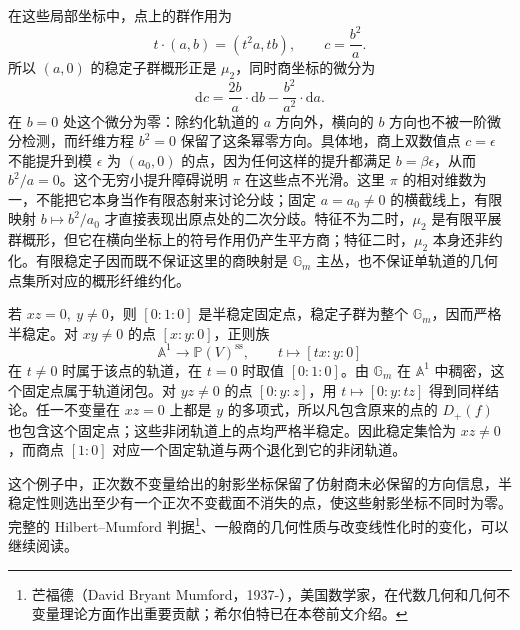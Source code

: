 \begin{example}
	\ProseParagraphBreak
	在这些局部坐标中，点上的群作用为
	\[
		t\cdot(a,b)=(t^2a,tb),\qquad c=\frac{b^2}{a}.
	\]
	所以 \((a,0)\) 的稳定子群概形正是 \(\mu_2\)，同时商坐标的微分为
	\[
		\mathrm{d}c=\frac{2b}{a}\cdot\mathrm{d}b -\frac{b^2}{a^2}\cdot\mathrm{d}a.
	\]
	在 \(b=0\) 处这个微分为零：除约化轨道的 \(a\) 方向外，横向的 \(b\) 方向也不被一阶微分检测，而纤维方程 \(b^2=0\) 保留了这条幂零方向。具体地，商上双数值点 \(c=\epsilon\) 不能提升到模 \(\epsilon\) 为 \((a_0,0)\) 的点，因为任何这样的提升都满足 \(b=\beta\epsilon\)，从而 \(b^2/a=0\)。这个无穷小提升障碍说明 \(\pi\) 在这些点不光滑。这里 \(\pi\) 的相对维数为一，不能把它本身当作有限态射来讨论分歧；固定 \(a=a_0\ne0\) 的横截线上，有限映射 \(b\mapsto b^2/a_0\) 才直接表现出原点处的二次分歧。特征不为二时，\(\mu_2\) 是有限平展群概形，但它在横向坐标上的符号作用仍产生平方商；特征二时，\(\mu_2\) 本身还非约化。有限稳定子因而既不保证这里的商映射是 \(\mathbb G_m\) 主丛，也不保证单轨道的几何点集所对应的概形纤维约化。

	若 \(xz=0,\ y\ne0\)，则 \([0:1:0]\) 是半稳定固定点，稳定子群为整个 \(\mathbb G_m\)，因而严格半稳定。对 \(xy\ne0\) 的点 \([x:y:0]\)，正则族
	\[
		\mathbb A^1\longrightarrow\mathbb P(V)^{\mathrm{ss}},\qquad t\longmapsto[tx:y:0]
	\]
	在 \(t\ne0\) 时属于该点的轨道，在 \(t=0\) 时取值 \([0:1:0]\)。由 \(\mathbb G_m\) 在 \(\mathbb A^1\) 中稠密，这个固定点属于轨道闭包。对 \(yz\ne0\) 的点 \([0:y:z]\)，用 \(t\mapsto[0:y:tz]\) 得到同样结论。任一不变量在 \(xz=0\) 上都是 \(y\) 的多项式，所以凡包含原来的点的 \(D_+(f)\) 也包含这个固定点；这些非闭轨道上的点均严格半稳定。因此稳定集恰为 \(xz\ne0\)，而商点 \([1:0]\) 对应一个固定轨道与两个退化到它的非闭轨道。
\end{example}

这个例子中，正次数不变量给出的射影坐标保留了仿射商未必保留的方向信息，半稳定性则选出至少有一个正次不变截面不消失的点，使这些射影坐标不同时为零。完整的 Hilbert--Mumford 判据\footnote{芒福德（David Bryant Mumford，1937-），美国数学家，在代数几何和几何不变量理论方面作出重要贡献；希尔伯特已在本卷前文介绍。}、一般商的几何性质与改变线性化时的变化，可以继续阅读\cite[Chapters 7--9]{Dolgachev2003InvariantTheory}。
